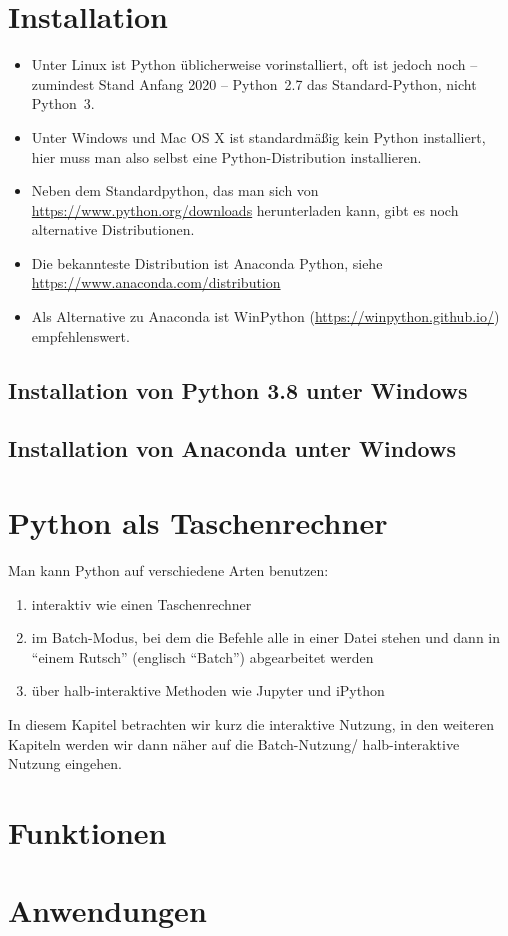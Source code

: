 \documentclass[12pt,ngerman]{scrreprt}
\begin{document}
\chapter{Installation}

\begin{itemize}
	\item Unter Linux ist Python üblicherweise vorinstalliert, oft ist jedoch noch -- zumindest Stand Anfang 2020 -- Python~2.7 das Standard-Python, nicht Python~3. 
	\item Unter Windows und Mac OS X ist standardmäßig kein Python installiert, hier muss man also selbst eine Python-Distribution installieren.
\item Neben dem Standardpython, das man sich von \url{https://www.python.org/downloads} herunterladen kann, gibt es noch alternative Distributionen.
	\item Die bekannteste Distribution ist Anaconda Python, siehe \url{https://www.anaconda.com/distribution}
	\item Als Alternative zu Anaconda ist WinPython (\url{https://winpython.github.io/}) empfehlenswert.
\end{itemize}

\section{Installation von Python 3.8 unter Windows}


\section{Installation von Anaconda unter Windows}


\chapter{Python als Taschenrechner}

Man kann Python auf verschiedene Arten benutzen:

\begin{enumerate}
\item interaktiv wie einen Taschenrechner
\item im Batch-Modus, bei dem die Befehle alle in einer Datei stehen und dann in \enquote{einem Rutsch} (englisch \enquote{Batch}) abgearbeitet werden
\item über halb-interaktive Methoden wie Jupyter und iPython
\end{enumerate}

In diesem Kapitel betrachten wir kurz die interaktive Nutzung, in den weiteren Kapiteln werden wir dann näher auf die Batch-Nutzung/ halb-interaktive Nutzung eingehen.

\chapter{Funktionen}

\chapter{Anwendungen}
\end{document}

